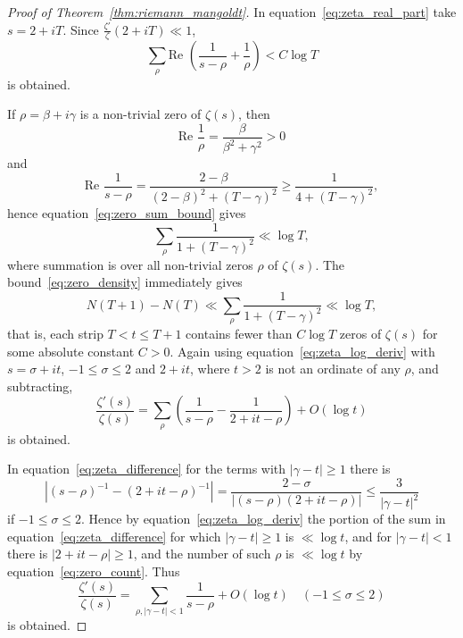 \documentclass[11pt]{article}
\begin{document}
\begin{proof}[Proof of Theorem~\ref{thm:riemann_mangoldt}]
In equation~\eqref{eq:zeta_real_part} take $s = 2 + iT$. Since $\frac{\zeta'}{\zeta}(2 + iT) \ll 1$, 
\begin{equation}\label{eq:zero_sum_bound}
\sum_{\rho} \text{Re } \left( \frac{1}{s-\rho} + \frac{1}{\rho} \right) < C \log T
\end{equation}
is obtained.

If $\rho = \beta + i\gamma$ is a non-trivial zero of $\zeta(s)$, then
\begin{equation}\label{eq:rho_real_part}
\text{Re } \frac{1}{\rho} = \frac{\beta}{\beta^2 + \gamma^2} > 0
\end{equation}
and
\begin{equation}\label{eq:s_rho_real_part}
\text{Re } \frac{1}{s-\rho} = \frac{2-\beta}{(2-\beta)^2 + (T-\gamma)^2} \geq \frac{1}{4 + (T-\gamma)^2},
\end{equation}
hence equation~\eqref{eq:zero_sum_bound} gives
\begin{equation}\label{eq:zero_density}
\sum_{\rho} \frac{1}{1 + (T-\gamma)^2} \ll \log T,
\end{equation}
where summation is over all non-trivial zeros $\rho$ of $\zeta(s)$. The bound~\eqref{eq:zero_density} immediately gives
\begin{equation}\label{eq:zero_count}
N(T+1) - N(T) \ll \sum_{\rho} \frac{1}{1 + (T-\gamma)^2} \ll \log T,
\end{equation}
that is, each strip $T < t \leq T+1$ contains fewer than $C \log T$ zeros of $\zeta(s)$ for some absolute constant $C > 0$. Again using equation~\eqref{eq:zeta_log_deriv} with $s = \sigma + it$, $-1 \leq \sigma \leq 2$ and $2 + it$, where $t > 2$ is not an ordinate of any $\rho$, and subtracting, 
\begin{equation}\label{eq:zeta_difference}
\frac{\zeta'(s)}{\zeta(s)} = \sum_{\rho} \left( \frac{1}{s-\rho} - \frac{1}{2+it-\rho} \right) + O(\log t)
\end{equation}
is obtained.

In equation~\eqref{eq:zeta_difference} for the terms with $|\gamma - t| \geq 1$ there is
\begin{equation}\label{eq:term_estimate}
\left| (s-\rho)^{-1} - (2+it-\rho)^{-1} \right| = \frac{2-\sigma}{|(s-\rho)(2+it-\rho)|} \leq \frac{3}{|\gamma - t|^2}
\end{equation}
if $-1 \leq \sigma \leq 2$. Hence by equation~\eqref{eq:zeta_log_deriv} the portion of the sum in equation~\eqref{eq:zeta_difference} for which $|\gamma - t| \geq 1$ is $\ll \log t$, and for $|\gamma - t| < 1$ there is $|2 + it - \rho| \geq 1$, and the number of such $\rho$ is $\ll \log t$ by equation~\eqref{eq:zero_count}. Thus
\begin{equation}\label{eq:zeta_local}
\frac{\zeta'(s)}{\zeta(s)} = \sum_{\rho, |\gamma - t| < 1} \frac{1}{s-\rho} + O(\log t) \quad (-1 \leq \sigma \leq 2)
\end{equation}
is obtained.


\end{proof}
\end{document}
